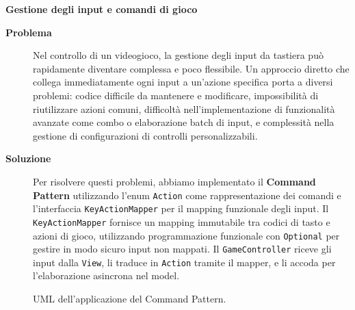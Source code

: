 \documentclass[a4paper,12pt]{report}
\begin{document}
\newpage
\noindent
\textbf{Gestione degli input e comandi di gioco}
\begin{description}
	\item[\textbf{Problema}]
	      Nel controllo di un videogioco, la gestione degli input da tastiera può rapidamente diventare complessa e poco flessibile. Un approccio diretto che collega immediatamente ogni input
	      a un'azione specifica porta a diversi problemi: codice difficile da mantenere e modificare, impossibilità di riutilizzare azioni comuni, difficoltà nell'implementazione di
	      funzionalità avanzate come combo o elaborazione batch di input, e complessità nella gestione di configurazioni di controlli personalizzabili.

	\item[\textbf{Soluzione}]
	      Per risolvere questi problemi, abbiamo implementato il \textbf{Command Pattern} utilizzando l'enum \texttt{Action} come rappresentazione dei comandi e l'interfaccia
	      \texttt{KeyActionMapper} per il mapping funzionale degli input. Il \texttt{KeyActionMapper} fornisce un mapping immutabile tra codici di tasto e azioni di gioco, utilizzando
	      programmazione funzionale con \texttt{Optional} per gestire in modo sicuro input non mappati. Il \texttt{GameController} riceve gli input dalla \texttt{View}, li traduce in
	      \texttt{Action} tramite il mapper, e li accoda per l'elaborazione asincrona nel model.
\end{description}
\begin{figure}[H]
	\centering{}
	
	\caption{UML dell'applicazione del Command Pattern.}
	\label{img:command}
\end{figure}
\end{document}

